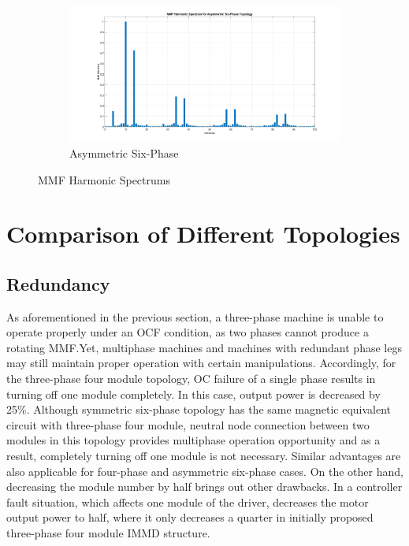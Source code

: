 \documentclass[a4paper,11pt]{article}
\begin{document}
\begin{figure}[ht!]
\begin{subfigure}[b]{0.33\textwidth}
    \centering
    \includegraphics[width=\linewidth]{mmf_harm_asym.png}
    \caption{Asymmetric Six-Phase}
    \label{fig:as6phmmf}    
\end{subfigure}
 \caption{MMF Harmonic Spectrums}
\end{figure}


\section{\normalsize\textbf{Comparison of Different Topologies}}
\subsection{\normalsize\textbf{Redundancy}}
As aforementioned in the previous section, a three-phase machine is unable to operate properly under an OCF condition, as two phases cannot produce a rotating MMF.Yet, multiphase machines and machines with redundant phase legs may still maintain proper operation with certain manipulations. Accordingly, for the three-phase four module topology, OC failure of a single phase results in turning off one module completely. In this case, output power is decreased by 25\%. Although symmetric six-phase topology has the same magnetic equivalent circuit with three-phase four module, neutral node connection between two modules in this topology provides multiphase operation opportunity and as a result, completely turning off one module is not necessary. Similar advantages are also applicable for four-phase and asymmetric six-phase cases. On the other hand, decreasing the module number by half brings out other drawbacks. In a controller fault situation, which affects one module of the driver, decreases the motor output power to half, where it only decreases a quarter in initially proposed three-phase four module IMMD structure.
\end{document}
